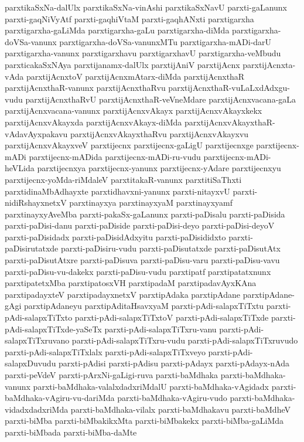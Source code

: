 {parxtikaSxNa-dalUlx
parxtikaSxNa-vinAshi
parxtikaSxNavU
parxti-gaLanunx
parxti-gaqNiVyAtf
parxti-gaqhiVtaM
parxti-gaqhANxti
parxtigarxha
parxtigarxha-gaLiMda
parxtigarxha-gaLu
parxtigarxha-diMda
parxtigarxha-doVSa-vanunx
parxtigarxha-doVSa-vanunxMTu
parxtigarxha-mADi-darU
parxtigarxha-vanunx
parxtigarxhavu
parxtigarxhavU
parxtigarxha-veMbudu
parxticakaSxNAya
parxtijanamx-dalUlx
parxtijAniV
parxtijAcnx
parxtijAcnxta-vAda
parxtijAcnxtoV
parxtijAcnxmAtarx-diMda
parxtijAcnxthaR
parxtijAcnxthaR-vanunx
parxtijAcnxthaRvu
parxtijAcnxthaR-vuLaLxdAdxgu-vudu
parxtijAcnxthaRvU
parxtijAcnxthaR-veVneMdare
parxtijAcnxvacana-gaLa
parxtijAcnxvacana-vanunx
parxtijAcnxvAkayx
parxtijAcnxvAkayxkekx
parxtijAcnxvAkayxda
parxtijAcnxvAkayx-diMda
parxtijAcnxvAkayxthaR-vAdavAyxpakavu
parxtijAcnxvAkayxthaRvu
parxtijAcnxvAkayxvu
parxtijAcnxvAkayxveV
parxtijecnx
parxtijecnx-gaLigU
parxtijecnxge
parxtijecnx-mADi
parxtijecnx-mADida
parxtijecnx-mADi-ru-vudu
parxtijecnx-mADi-heVLida
parxtijecnxya
parxtijecnx-yanunx
parxtijecnx-yAdare
parxtijecnxyu
parxtijecnx-yoMda-riMdaleV
parxtitakaR-vanunx
parxtitiSaThxti
parxtidinaMbAdhayxte
parxtidhavxni-yanunx
parxti-nitayxvU
parxti-nidiRshayxnetxV
parxtinayxya
parxtinayxyaM
parxtinayxyamf
parxtinayxyAveMba
parxti-pakaSx-gaLanunx
parxti-paDisalu
parxti-paDisida
parxti-paDisi-danu
parxti-paDiside
parxti-paDisi-deyo
parxti-paDisi-deyoV
parxti-paDisidadx
parxti-paDisidAdxyitu
parxti-paDisididxto
parxti-paDisirutatxde
parxti-paDisiru-vudu
parxti-paDisutatxde
parxti-paDisutAtx
parxti-paDisutAtxre
parxti-paDisuva
parxti-paDisu-varu
parxti-paDisu-vavu
parxti-paDisu-vu-dakekx
parxti-paDisu-vudu
parxtipatf
parxtipatatxnunx
parxtipatetxMba
parxtipatosxVH
parxtipadaM
parxtipadavAyxKAna
parxtipadayxteV
parxtipadayxnetxV
parxtipAdaka
parxtipAdane
parxtipAdane-gAgi
parxtipAdaneyu
parxtipAditaHsavxyaM
parxti-pAdi-salapxTiTxtu
parxti-pAdi-salapxTiTxto
parxti-pAdi-salapxTiTxtoV
parxti-pAdi-salapxTiTxde
parxti-pAdi-salapxTiTxde-yaSeTx
parxti-pAdi-salapxTiTxru-vanu
parxti-pAdi-salapxTiTxruvano
parxti-pAdi-salapxTiTxru-vudu
parxti-pAdi-salapxTiTxruvudo
parxti-pAdi-salapxTiTxlalx
parxti-pAdi-salapxTiTxveyo
parxti-pAdi-salapxDuvudu
parxti-pAdisi
parxti-pAdisu
parxti-pAdayx
parxti-pAdayx-nAda
parxti-peVdeV
parxti-pArxNi-gaLigi-ruva
parxti-baMdhaka
parxti-baMdhaka-vanunx
parxti-baMdhaka-valalxdadxriMdalU
parxti-baMdhaka-vAgidadx
parxti-baMdhaka-vAgiru-vu-dariMda
parxti-baMdhaka-vAgiru-vudo
parxti-baMdhaka-vidadxdadxriMda
parxti-baMdhaka-vilalx
parxti-baMdhakavu
parxti-baMdheV
parxti-biMba
parxti-biMbakikxMta
parxti-biMbakekx
parxti-biMba-gaLiMda
parxti-biMbada
parxti-biMba-daMte
}
